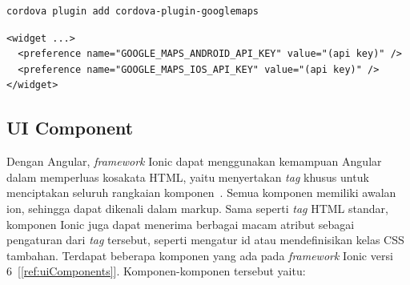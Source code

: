 \begin{lstlisting}[label={lst:installGMapsCordova}, caption=Kode untuk Menginstal \textit{Plugin} Cordova Google Maps]
cordova plugin add cordova-plugin-googlemaps
\end{lstlisting} 

\begin{lstlisting}[label={lst:apikeyGMapsCordova}, caption=Kode untuk Mengatur API Key untuk \textit{Plugin} Cordova Google Maps]
<widget ...>
  <preference name="GOOGLE_MAPS_ANDROID_API_KEY" value="(api key)" />
  <preference name="GOOGLE_MAPS_IOS_API_KEY" value="(api key)" />
</widget>
\end{lstlisting} 

\subsection{UI Component}
\label{subsec:uiComponent}
Dengan Angular, {\it framework} Ionic dapat menggunakan kemampuan Angular dalam memperluas kosakata HTML, yaitu menyertakan {\it tag} khusus untuk menciptakan seluruh rangkaian komponen~\cite{griffith:17:mobile}. Semua komponen memiliki awalan ion, sehingga dapat dikenali dalam markup. Sama seperti {\it tag} HTML standar, komponen Ionic juga dapat menerima berbagai macam atribut sebagai pengaturan dari {\it tag} tersebut, seperti mengatur id atau mendefinisikan kelas CSS tambahan. Terdapat beberapa komponen yang ada pada {\it framework} Ionic versi 6~[\ref{ref:uiComponents}]. Komponen-komponen tersebut yaitu:
